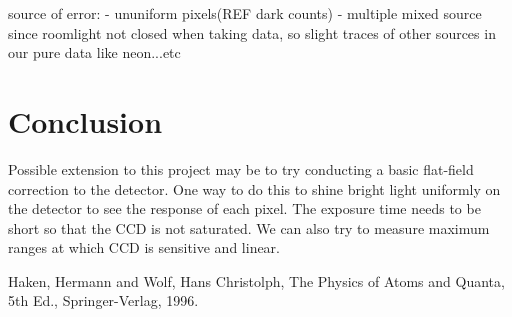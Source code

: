 \documentclass[authoryear, 12pt,5p, times]{elsarticle}
\begin{document}
source of error: 
- ununiform pixels(REF dark counts)
- multiple mixed source since roomlight not closed when taking data, so slight traces of other sources in our pure data like neon...etc
 
\section{Conclusion}

Possible extension to this project may be to try conducting a basic flat-field correction to the detector. One way to do this to shine bright light uniformly on the detector to see the response of each pixel.  The exposure time needs to be short so that the CCD is not saturated. We can also try to measure maximum ranges at which CCD is sensitive and linear.

%
%
%

Haken, Hermann and Wolf, Hans Christolph, The Physics of Atoms and Quanta, 5th Ed., Springer-Verlag, 1996.
\end{document}
